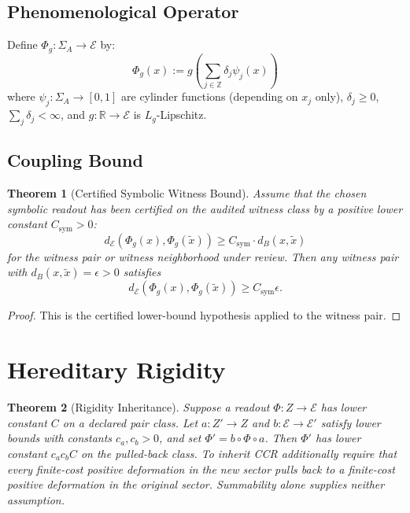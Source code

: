 \documentclass[11pt,a4paper]{article}
\theoremstyle{plain}
\newtheorem{theorem}{Theorem}[section]
\theoremstyle{definition}
\theoremstyle{remark}
\newcommand{\E}{\mathcal{E}}
\newcommand{\dE}{d_{\mathcal{E}}}
\begin{document}
\subsection{Phenomenological Operator}

Define $\Phi_g: \Sigma_A \to \E$ by:
\[
\Phi_g(x) := g\left( \sum_{j \in \mathbb{Z}} \delta_j \psi_j(x) \right)
\]
where $\psi_j: \Sigma_A \to [0,1]$ are cylinder functions (depending on $x_j$ only), $\delta_j \geq 0$, $\sum_j \delta_j < \infty$, and $g: \mathbb{R} \to \E$ is $L_g$-Lipschitz.

\subsection{Coupling Bound}

\begin{theorem}[Certified Symbolic Witness Bound]
Assume that the chosen symbolic readout has been certified on the audited witness class by a positive lower constant $C_{\mathrm{sym}}>0$:
\[
\dE(\Phi_g(x), \Phi_g(\tilde{x})) \geq C_{\mathrm{sym}} \cdot d_B(x, \tilde{x})
\]
for the witness pair or witness neighborhood under review. Then any witness pair with $d_B(x,\tilde{x})=\epsilon>0$ satisfies
\[
\dE(\Phi_g(x),\Phi_g(\tilde{x}))\geq C_{\mathrm{sym}}\epsilon.
\]
\end{theorem}

\begin{proof}
This is the certified lower-bound hypothesis applied to the witness pair.
\end{proof}

\section{Hereditary Rigidity}\label{app:hereditary-rigidity}

\begin{theorem}[Rigidity Inheritance]
Suppose a readout $\Phi:Z\to\E$ has lower constant $C$ on a declared pair class. Let $a:Z'\to Z$ and $b:\E\to\E'$ satisfy lower bounds with constants $c_a,c_b>0$, and set $\Phi'=b\circ\Phi\circ a$. Then $\Phi'$ has lower constant $c_ac_bC$ on the pulled-back class. To inherit CCR additionally require that every finite-cost positive deformation in the new sector pulls back to a finite-cost positive deformation in the original sector. Summability alone supplies neither assumption.
\end{theorem}
\end{document}
